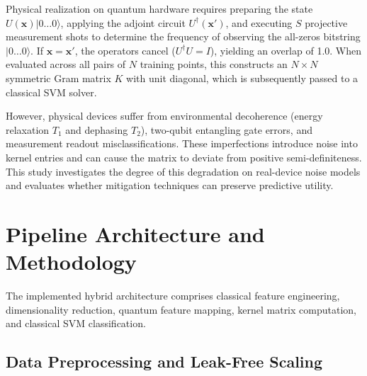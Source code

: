 \documentclass[12pt,a4paper]{article}
\begin{document}
Physical realization on quantum hardware requires preparing the state $U(\mathbf{x})|0\dots 0\rangle$, applying the adjoint circuit $U^{\dagger}(\mathbf{x}')$, and executing $S$ projective measurement shots to determine the frequency of observing the all-zeros bitstring $|0\dots 0\rangle$. If $\mathbf{x} = \mathbf{x}'$, the operators cancel ($U^{\dagger}U = I$), yielding an overlap of 1.0. When evaluated across all pairs of $N$ training points, this constructs an $N \times N$ symmetric Gram matrix $K$ with unit diagonal, which is subsequently passed to a classical SVM solver.

However, physical devices suffer from environmental decoherence (energy relaxation $T_1$ and dephasing $T_2$), two-qubit entangling gate errors, and measurement readout misclassifications. These imperfections introduce noise into kernel entries and can cause the matrix to deviate from positive semi-definiteness. This study investigates the degree of this degradation on real-device noise models and evaluates whether mitigation techniques can preserve predictive utility.

\section{Pipeline Architecture and Methodology}

The implemented hybrid architecture comprises classical feature engineering, dimensionality reduction, quantum feature mapping, kernel matrix computation, and classical SVM classification.

\subsection{Data Preprocessing and Leak-Free Scaling}
\end{document}
